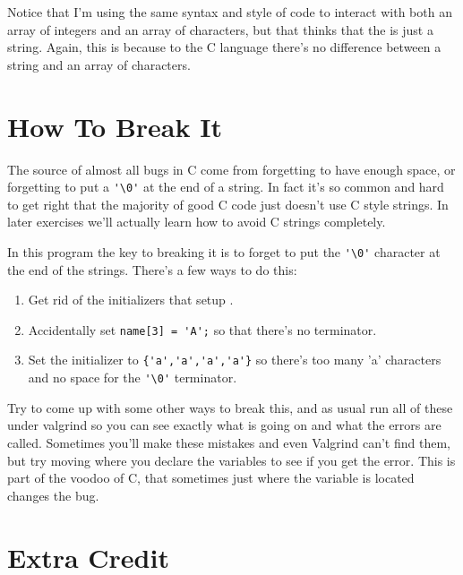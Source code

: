 Notice that I'm using the same syntax and style of code to interact with both
an array of integers and an array of characters, but that  thinks
that the  is just a string.  Again, this is because to the C
language there's no difference between a string and an array of characters.

\section{How To Break It}

The source of almost all bugs in C come from forgetting to have enough
space, or forgetting to put a \verb|'\0'| at the end of a string.  In
fact it's so common and hard to get right that the majority of good C
code just doesn't use C style strings.  In later exercises we'll actually
learn how to avoid C strings completely.

In this program the key to breaking it is to forget to put the \verb|'\0'|
character at the end of the strings.  There's a few ways to do this:

\begin{enumerate}
\item Get rid of the initializers that setup .
\item Accidentally set \verb|name[3] = 'A';| so that there's no terminator.
\item Set the initializer to \verb|{'a','a','a','a'}| so there's too many
    'a' characters and no space for the \verb|'\0'| terminator.
\end{enumerate}

Try to come up with some other ways to break this, and as usual run all of
these under valgrind so you can see exactly what is going on and what the
errors are called.  Sometimes you'll make these mistakes and even
Valgrind can't find them, but try moving where you declare the variables
to see if you get the error.  This is part of the voodoo of C, that
sometimes just where the variable is located changes the bug.

\section{Extra Credit}

